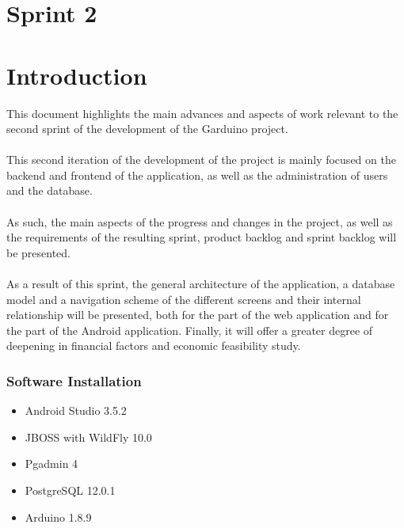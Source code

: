 \documentclass[11pt,a4paper]{article}
\begin{document}
\tableofcontents

\newpage

\vspace*{0.3in}
\listoftables
\listoffigures
\newpage

\part*{Sprint 2}
\part*{Introduction}
This document highlights the main advances and aspects of work relevant to the second sprint of the development of the Garduino project. 
\\ \\
This second iteration of the development of the project is mainly focused on the backend and frontend of the application, as well as the administration of users and the database. 
\\ \\
As such, the main aspects of the progress and changes in the project, as well as the requirements of the resulting sprint, product backlog and sprint backlog will be presented. 
\\ \\
As a result of this sprint, the general architecture of the application, a database model and a navigation scheme of the different screens and their internal relationship will be presented, both for the part of the web application and for the part of the Android application. Finally, it will offer a greater degree of deepening in financial factors and economic feasibility study.
\section{Software Installation}
\begin{itemize}
    \item Android Studio 3.5.2
    \item JBOSS with WildFly 10.0
    \item Pgadmin 4
    \item PostgreSQL 12.0.1
    \item Arduino 1.8.9
\end{itemize}
\end{document}
